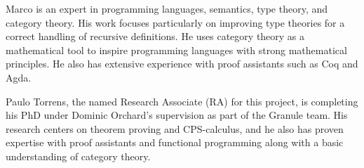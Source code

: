 \documentclass[11pt]{article}
\begin{document}
Marco is an expert in programming languages, semantics, type theory, and
category theory. His work focuses particularly on improving type theories for a
correct handling of recursive definitions. He uses category theory as a
mathematical tool to inspire programming languages with strong mathematical
principles. He also has extensive experience with proof assistants such as Coq
and Agda.

Paulo Torrens, the named Research Associate (RA) for this project, is completing
his PhD under Dominic Orchard's supervision as part of the Granule team. His research centers
on theorem proving and CPS-calculus, and he also has proven expertise with
proof assistants and functional programming along with a basic understanding of
category theory.



\end{document}
